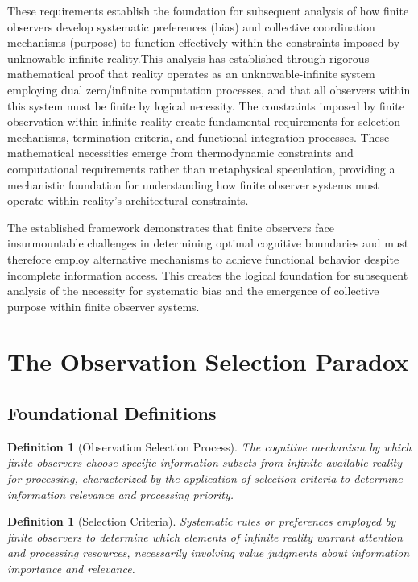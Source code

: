 \documentclass[12pt,a4paper]{article}
\newtheorem{definition}[theorem]{Definition}
\begin{document}
These requirements establish the foundation for subsequent analysis of how finite observers develop systematic preferences (bias) and collective coordination mechanisms (purpose) to function effectively within the constraints imposed by unknowable-infinite reality.This analysis has established through rigorous mathematical proof that reality operates as an unknowable-infinite system employing dual zero/infinite computation processes, and that all observers within this system must be finite by logical necessity. The constraints imposed by finite observation within infinite reality create fundamental requirements for selection mechanisms, termination criteria, and functional integration processes. These mathematical necessities emerge from thermodynamic constraints and computational requirements rather than metaphysical speculation, providing a mechanistic foundation for understanding how finite observer systems must operate within reality's architectural constraints.

The established framework demonstrates that finite observers face insurmountable challenges in determining optimal cognitive boundaries and must therefore employ alternative mechanisms to achieve functional behavior despite incomplete information access. This creates the logical foundation for subsequent analysis of the necessity for systematic bias and the emergence of collective purpose within finite observer systems.

\section{The Observation Selection Paradox}

\subsection{Foundational Definitions}

\begin{definition}[Observation Selection Process]
The cognitive mechanism by which finite observers choose specific information subsets from infinite available reality for processing, characterized by the application of selection criteria to determine information relevance and processing priority.
\end{definition}

\begin{definition}[Selection Criteria]
Systematic rules or preferences employed by finite observers to determine which elements of infinite reality warrant attention and processing resources, necessarily involving value judgments about information importance and relevance.
\end{definition}
\end{document}
